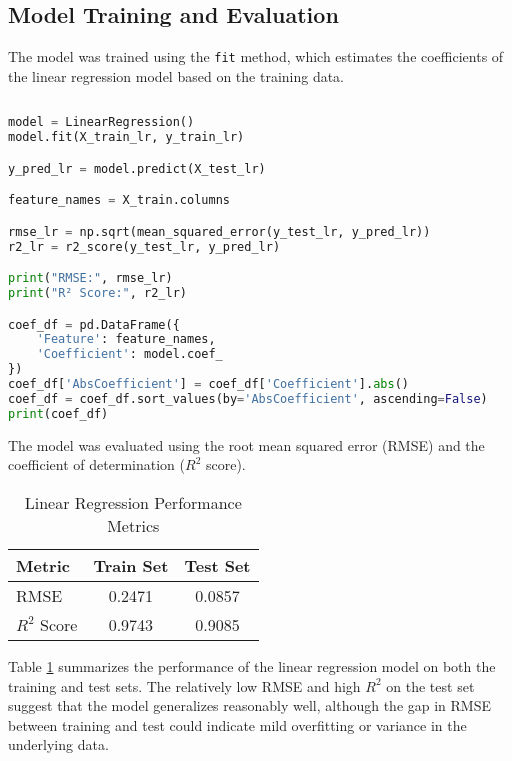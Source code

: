 \subsection{Model Training and Evaluation}
\label{sec:linearregression-training}
The model was trained using the \texttt{fit} method, which estimates the coefficients of the linear regression model based on the training data.
\begin{lstlisting}[language=Python, caption={Training the Linear Regression model}, label={lst:linearregression-training}]
  
model = LinearRegression()
model.fit(X_train_lr, y_train_lr)

y_pred_lr = model.predict(X_test_lr)

feature_names = X_train.columns

rmse_lr = np.sqrt(mean_squared_error(y_test_lr, y_pred_lr))
r2_lr = r2_score(y_test_lr, y_pred_lr)

print("RMSE:", rmse_lr)
print("R² Score:", r2_lr)

coef_df = pd.DataFrame({
    'Feature': feature_names,
    'Coefficient': model.coef_
})
coef_df['AbsCoefficient'] = coef_df['Coefficient'].abs()
coef_df = coef_df.sort_values(by='AbsCoefficient', ascending=False)
print(coef_df)

\end{lstlisting}

The model was evaluated using the root mean squared error (RMSE) and the coefficient of determination ($R^2$ score).

\begin{table}[H]
\centering
\caption{Linear Regression Performance Metrics}
\label{tab:linearregression-performance}
\begin{tabular}{lcc}
\toprule
\textbf{Metric} & \textbf{Train Set} & \textbf{Test Set} \\
\midrule
RMSE           & 0.2471             & 0.0857            \\
$R^2$ Score    & 0.9743             & 0.9085            \\
\bottomrule
\end{tabular}
\end{table}

Table \ref{tab:linearregression-performance} summarizes the performance of the linear regression model on both the training and test sets. 
The relatively low RMSE and high $R^2$ on the test set suggest that the model generalizes reasonably well, although the gap in RMSE between training and test could indicate mild overfitting or variance in the underlying data.

